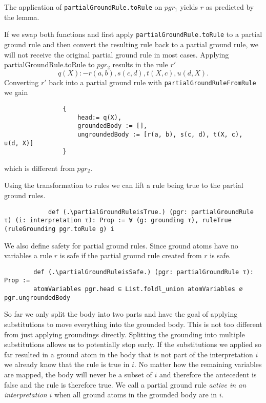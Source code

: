         \begin{example}
            The application of \texttt{partialGroundRule.toRule} on $pgr_1$ yields $r$ as predicted by the lemma.

            If we swap both functions and first apply \texttt{partialGroundRule.toRule} to a partial ground rule and then convert the resulting rule back to a partial ground rule, we will not receive the original partial ground rule in most cases. Applying {partialGroundRule.toRule} to $pgr_2$ results in the rule $r'$ \[q(X) :- r(a, b), s(c, d), t(X, c),  u(d, X) . \] Converting $r'$ back into a partial ground rule with \texttt{partialGroundRuleFromRule} we gain 

            \begin{lstlisting}
                {
                    head:= q(X),
                    groundedBody := [],
                    ungroundedBody := [r(a, b), s(c, d), t(X, c),  u(d, X)]
                }
            \end{lstlisting}
            which is different from $pgr_2$.
        \end{example}

        Using the transformation to rules we can lift a rule being true to the partial ground rules.

        \begin{lstlisting}
            def (.\partialGroundRuleisTrue.) (pgr: partialGroundRule τ) (i: interpretation τ): Prop := ∀ (g: grounding τ), ruleTrue (ruleGrounding pgr.toRule g) i
        \end{lstlisting}

        We also define safety for partial ground rules. Since ground atoms have no variables a rule $r$ is safe if the partial ground rule created from $r$ is safe.

        \begin{lstlisting}     
        def (.\partialGroundRuleisSafe.) (pgr: partialGroundRule τ): Prop :=
        atomVariables pgr.head ⊆ List.foldl_union atomVariables ∅ pgr.ungroundedBody
        \end{lstlisting}

        So far we only split the body into two parts and have the goal of applying substitutions to move everything into the grounded body. This is not too different from just applying groundings directly. 
        Splitting the grounding into multiple substitutions allows us to potentially stop early. If the substitutions we applied so far resulted in a ground atom in the body that is not part of the interpretation $i$ we already know that the rule is true in $i$. No matter how the remaining variables are mapped, the body will never be a subset of $i$ and therefore the antecedent is false and the rule is therefore true. We call a partial ground rule \textit{active in an interpretation} $i$ when all ground atoms in the grounded body are in $i$.

